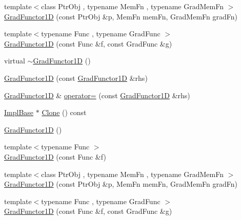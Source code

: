 \begin{DoxyCompactItemize}
\item 
{\footnotesize template$<$class Ptr\+Obj , typename Mem\+Fn , typename Grad\+Mem\+Fn $>$ }\\\mbox{\hyperlink{classROOT_1_1Math_1_1GradFunctor1D_a651aeef91a3d1a3ae323969d7239ebb2}{Grad\+Functor1D}} (const Ptr\+Obj \&p, Mem\+Fn mem\+Fn, Grad\+Mem\+Fn grad\+Fn)
\item 
{\footnotesize template$<$typename Func , typename Grad\+Func $>$ }\\\mbox{\hyperlink{classROOT_1_1Math_1_1GradFunctor1D_a30baab2a961d896e4aab6e60ed30d260}{Grad\+Functor1D}} (const Func \&f, const Grad\+Func \&g)
\item 
virtual \mbox{\hyperlink{classROOT_1_1Math_1_1GradFunctor1D_ac711d3cc551b961aa16ecdcbf50308d6}{$\sim$\+Grad\+Functor1D}} ()
\item 
\mbox{\hyperlink{classROOT_1_1Math_1_1GradFunctor1D_af43388b384674d1e811cfbc1ad562816}{Grad\+Functor1D}} (const \mbox{\hyperlink{classROOT_1_1Math_1_1GradFunctor1D}{Grad\+Functor1D}} \&rhs)
\item 
\mbox{\hyperlink{classROOT_1_1Math_1_1GradFunctor1D}{Grad\+Functor1D}} \& \mbox{\hyperlink{classROOT_1_1Math_1_1GradFunctor1D_a3ea006d92100ba76a6fae9f57499c60d}{operator=}} (const \mbox{\hyperlink{classROOT_1_1Math_1_1GradFunctor1D}{Grad\+Functor1D}} \&rhs)
\item 
\mbox{\hyperlink{classROOT_1_1Math_1_1GradFunctor1D_a16b436a0d100aa6c16ee66961c4f5b97}{Impl\+Base}} $\ast$ \mbox{\hyperlink{classROOT_1_1Math_1_1GradFunctor1D_ab8280aaf240a374fb7a67808d858af79}{Clone}} () const
\item 
\mbox{\hyperlink{classROOT_1_1Math_1_1GradFunctor1D_a8691d070a442abf40d5709588edf93fe}{Grad\+Functor1D}} ()
\item 
{\footnotesize template$<$typename Func $>$ }\\\mbox{\hyperlink{classROOT_1_1Math_1_1GradFunctor1D_a740a6020efe7284e5eca301a89a127e8}{Grad\+Functor1D}} (const Func \&f)
\item 
{\footnotesize template$<$class Ptr\+Obj , typename Mem\+Fn , typename Grad\+Mem\+Fn $>$ }\\\mbox{\hyperlink{classROOT_1_1Math_1_1GradFunctor1D_a651aeef91a3d1a3ae323969d7239ebb2}{Grad\+Functor1D}} (const Ptr\+Obj \&p, Mem\+Fn mem\+Fn, Grad\+Mem\+Fn grad\+Fn)
\item 
{\footnotesize template$<$typename Func , typename Grad\+Func $>$ }\\\mbox{\hyperlink{classROOT_1_1Math_1_1GradFunctor1D_a30baab2a961d896e4aab6e60ed30d260}{Grad\+Functor1D}} (const Func \&f, const Grad\+Func \&g)

\end{DoxyCompactItemize}
